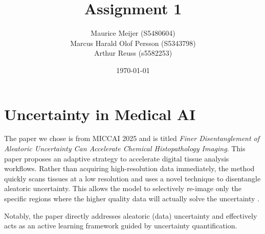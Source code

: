 \documentclass{article}
\title{Assignment 1}
\author{Maurice Meijer (S5480604) \\ Marcus Harald Olof Persson (S5343798) \\ Arthur Reuss (s5582253)}
\date{\today}
\begin{document}
\maketitle

\section{Uncertainty in Medical AI}

The paper we chose is from MICCAI 2025 and is titled \textit{Finer Disentanglement of Aleatoric Uncertainty Can Accelerate Chemical Histopathology Imaging}. This paper proposes an adaptive strategy to accelerate digital tissue analysis workflows. Rather than acquiring high-resolution data immediately, the method quickly scans tissues at a low resolution and uses a novel technique to disentangle aleatoric uncertainty. This allows the model to selectively re-image only the specific regions where the higher quality data will actually solve the uncertainty \cite{OhJi_Finer_MICCAI2025}.

Notably, the paper directly addresses aleatoric (data) uncertainty and effectively acts as an active learning framework guided by uncertainty quantification.
\end{document}
